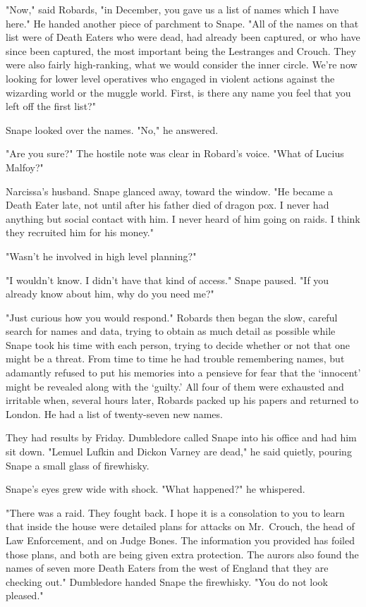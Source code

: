 "Now," said Robards, "in December, you gave us a list of names which I have here." He handed another piece of parchment to Snape. "All of the names on that list were of Death Eaters who were dead, had already been captured, or who have since been captured, the most important being the Lestranges and Crouch. They were also fairly high-ranking, what we would consider the inner circle. We're now looking for lower level operatives who engaged in violent actions against the wizarding world or the muggle world. First, is there any name you feel that you left off the first list?"

Snape looked over the names. "No," he answered.

"Are you sure?" The hostile note was clear in Robard's voice. "What of Lucius Malfoy?"

Narcissa's husband. Snape glanced away, toward the window. "He became a Death Eater late, not until after his father died of dragon pox. I never had anything but social contact with him. I never heard of him going on raids. I think they recruited him for his money."

"Wasn't he involved in high level planning?"

"I wouldn't know. I didn't have that kind of access." Snape paused. "If you already know about him, why do you need me?"

"Just curious how you would respond." Robards then began the slow, careful search for names and data, trying to obtain as much detail as possible while Snape took his time with each person, trying to decide whether or not that one might be a threat. From time to time he had trouble remembering names, but adamantly refused to put his memories into a pensieve for fear that the `innocent' might be revealed along with the `guilty.' All four of them were exhausted and irritable when, several hours later, Robards packed up his papers and returned to London. He had a list of twenty-seven new names.

They had results by Friday. Dumbledore called Snape into his office and had him sit down. "Lemuel Lufkin and Dickon Varney are dead," he said quietly, pouring Snape a small glass of firewhisky.

Snape's eyes grew wide with shock. "What happened?" he whispered.

"There was a raid. They fought back. I hope it is a consolation to you to learn that inside the house were detailed plans for attacks on Mr.~Crouch, the head of Law Enforcement, and on Judge Bones. The information you provided has foiled those plans, and both are being given extra protection. The aurors also found the names of seven more Death Eaters from the west of England that they are checking out." Dumbledore handed Snape the firewhisky. "You do not look pleased."

